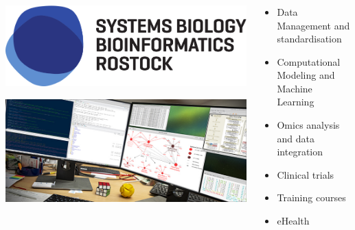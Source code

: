 \documentclass[x11names, svgnames]{beamer}
\begin{document}
%
%
%
\begin{frame}
  \frametitle{\one}
  \begin{columns}[T]
    \begin{column}{0.5\textwidth}
      \begin{center}
        \vspace{-1em}
        \includegraphics[scale=0.2]{images/logo_sbi}
      \end{center}
      \begin{center}
        \includegraphics[scale=0.3]{images/markus_desk}
      \end{center}
    \end{column}
    \begin{column}{0.4\textwidth}
      \small{
      \begin{itemize}
        \vspace{-1em}
        \itemsep1em
        \item Data Management and standardisation
        \item Computational Modeling and Machine Learning
        \item Omics analysis and data integration
        \item Clinical trials
        \item Training courses
        \item eHealth
      \end{itemize}
      }
    \end{column}
  \end{columns}
\end{frame}
\end{document}
